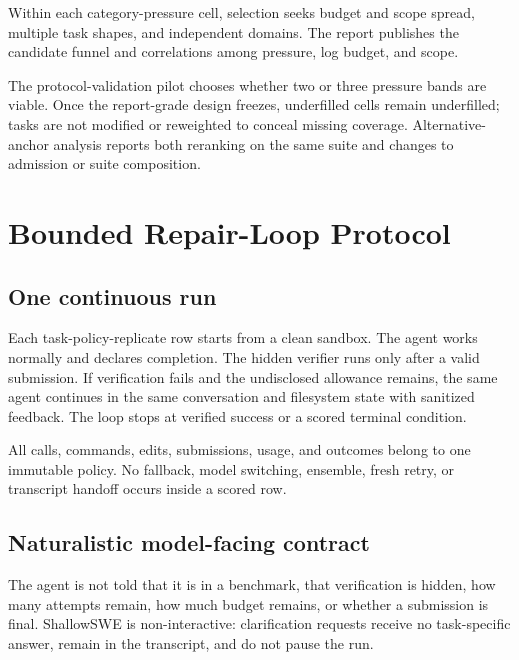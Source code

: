 \documentclass[11pt]{article}
\begin{document}
Within each category-pressure cell, selection seeks budget and scope spread, multiple task shapes, and independent domains. The report publishes the candidate funnel and correlations among pressure, log budget, and scope.

The protocol-validation pilot chooses whether two or three pressure bands are viable. Once the report-grade design freezes, underfilled cells remain underfilled; tasks are not modified or reweighted to conceal missing coverage. Alternative-anchor analysis reports both reranking on the same suite and changes to admission or suite composition.

\section{Bounded Repair-Loop Protocol}\hypertarget{7-bounded-repair-loop-protocol}{}\label{7-bounded-repair-loop-protocol}

\subsection{One continuous run}\hypertarget{71-one-continuous-run}{}\label{71-one-continuous-run}

Each task-policy-replicate row starts from a clean sandbox. The agent works normally and declares completion. The hidden verifier runs only after a valid submission. If verification fails and the undisclosed allowance remains, the same agent continues in the same conversation and filesystem state with sanitized feedback. The loop stops at verified success or a scored terminal condition.

All calls, commands, edits, submissions, usage, and outcomes belong to one immutable policy. No fallback, model switching, ensemble, fresh retry, or transcript handoff occurs inside a scored row.

\subsection{Naturalistic model-facing contract}\hypertarget{72-naturalistic-model-facing-contract}{}\label{72-naturalistic-model-facing-contract}

The agent is not told that it is in a benchmark, that verification is hidden, how many attempts remain, how much budget remains, or whether a submission is final. ShallowSWE is non-interactive: clarification requests receive no task-specific answer, remain in the transcript, and do not pause the run.
\end{document}
